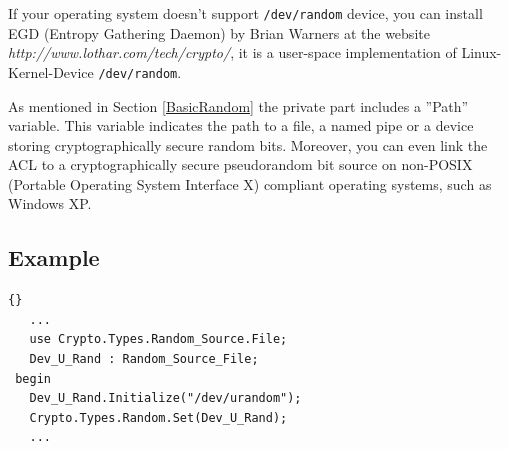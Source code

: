 If your operating system doesn't support \texttt{/dev/random} device, you can
install EGD (Entropy Gathering Daemon) by Brian Warners at the website
\textit{http://www.lothar.com/tech/cr\-ypto/}, it is a user-space
implementation of Linux-Kernel-Device \texttt{/dev/random}.

As mentioned in Section \ref{BasicRandom} the private part includes a
''Path'' variable. This variable indicates the path to a file, a named
pipe or a device storing cryptographically secure random
bits. Moreover, you can even link the ACL to a cryptographically
secure pseudorandom bit source on non-POSIX (Portable Operating System
Interface X) compliant operating systems, such as Windows XP.


\subsection*{Example}
\begin{lstlisting}{}
   ...
   use Crypto.Types.Random_Source.File;
   Dev_U_Rand : Random_Source_File;
 begin
   Dev_U_Rand.Initialize("/dev/urandom");
   Crypto.Types.Random.Set(Dev_U_Rand);
   ...
\end{lstlisting}
